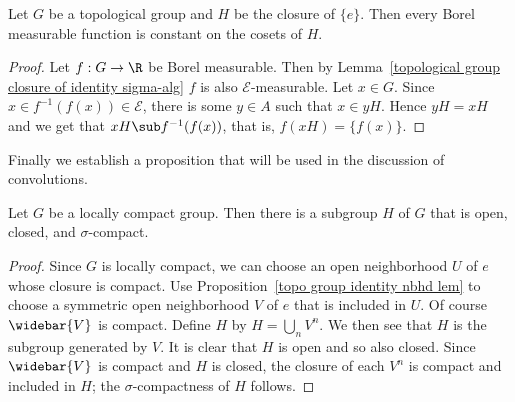\begin{proposition}\label{Borel measurable constant on closure of identity}
Let $G$ be a topological group and $H$ be the closure of $\{e\}$. Then every Borel measurable function is constant on the cosets of $H$.
\end{proposition}
\begin{proof}
Let $f:G\to\R$ be Borel measurable. Then by Lemma~\ref{topological group closure of identity sigma-alg} $f$ is also $\mathcal{E}$-measurable. Let $x\in G$. Since $x\in f^{-1}(f(x))\in\mathcal{E}$, there is some $y\in A$ such that $x\in yH$. Hence $yH=xH$ and we get that $xH\sub f^{-1}(f(x))$, that is, $f(xH)=\{f(x)\}$.
\end{proof}
Finally we establish a proposition that will be used in the discussion of convolutions.
\begin{proposition}\label{LCH group contains sigma-compact subgroup}
Let $G$ be a locally compact group. Then there is a subgroup $H$ of $G$ that is open, closed, and $\sigma$-compact.
\end{proposition}
\begin{proof}
Since $G$ is locally compact, we can choose an open neighborhood $U$ of $e$ whose closure is compact. Use Proposition~\ref{topo group identity nbhd lem} to choose a symmetric open neighborhood $V$ of $e$ that is included in $U$. Of course $\widebar{V}$ is compact. Define $H$ by $H=\bigcup_nV^n$. We then see that $H$ is the subgroup generated by $V$. It is clear that $H$ is open and so also closed. Since $\widebar{V}$ is compact and $H$ is closed, the closure of each $V^n$ is compact and included in $H$; the $\sigma$-compactness of $H$ follows.
\end{proof}
